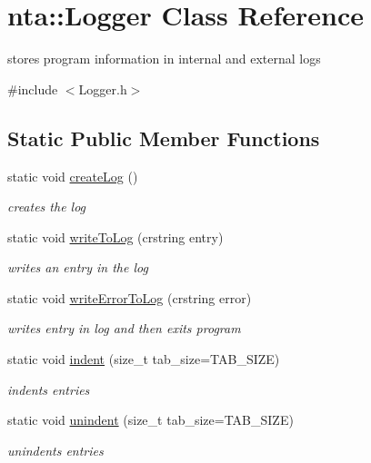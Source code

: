 \hypertarget{classnta_1_1Logger}{}\section{nta\+:\+:Logger Class Reference}
\label{classnta_1_1Logger}


stores program information in internal and external logs  




{\ttfamily \#include $<$Logger.\+h$>$}

\subsection*{Static Public Member Functions}
\begin{DoxyCompactItemize}
\item 
\mbox{\label{classnta_1_1Logger_a308a3ec22f996556b3d54737ace33543}} 
static void \hyperlink{classnta_1_1Logger_a308a3ec22f996556b3d54737ace33543}{create\+Log} ()
\begin{DoxyCompactList}\small\item\em creates the log \end{DoxyCompactList}\item 
\mbox{\label{classnta_1_1Logger_a71196417598ddd975959924c2ce53c13}} 
static void \hyperlink{classnta_1_1Logger_a71196417598ddd975959924c2ce53c13}{write\+To\+Log} (crstring entry)
\begin{DoxyCompactList}\small\item\em writes an entry in the log \end{DoxyCompactList}\item 
static void \hyperlink{classnta_1_1Logger_a08299f1414203eba74b306ce6712192e}{write\+Error\+To\+Log} (crstring error)
\begin{DoxyCompactList}\small\item\em writes entry in log and then exits program \end{DoxyCompactList}\item 
\mbox{\label{classnta_1_1Logger_aae8be3709ec3023f987f9b70304cd641}} 
static void \hyperlink{classnta_1_1Logger_aae8be3709ec3023f987f9b70304cd641}{indent} (size\+\_\+t tab\+\_\+size=T\+A\+B\+\_\+\+S\+I\+ZE)
\begin{DoxyCompactList}\small\item\em indents entries \end{DoxyCompactList}\item 
\mbox{\label{classnta_1_1Logger_a34abdfe89740b8e37461a610f441c8fa}} 
static void \hyperlink{classnta_1_1Logger_a34abdfe89740b8e37461a610f441c8fa}{unindent} (size\+\_\+t tab\+\_\+size=T\+A\+B\+\_\+\+S\+I\+ZE)
\begin{DoxyCompactList}\small\item\em unindents entries \end{DoxyCompactList}\end{DoxyCompactItemize}
